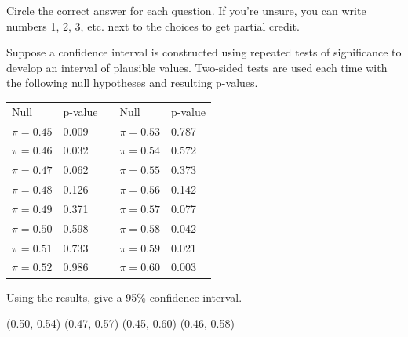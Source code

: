\documentclass{article}
\begin{document}
	Circle the correct answer for each question.  If you're unsure, you can write numbers 1, 2, 3, etc. next to the choices to get partial credit.\\[.5cm]
	\begin{mcquestions}
		\question Suppose a confidence interval is constructed using repeated tests of significance to develop an interval of plausible values.  Two-sided tests are used each time with the following null hypotheses and resulting p-values.
		\begin{center}
			\begin{tabular}{llp{.75in}ll}
				Null              & p-value & & Null              & p-value  \\
				$\pi = 0.45$ & 0.009   &                                 & $\pi = 0.53$ & 0.787    \\
				$\pi = 0.46$ & 0.032   &                                 & $\pi = 0.54$ & 0.572    \\
				$\pi = 0.47$ & 0.062   &                                 & $\pi = 0.55$ & 0.373    \\
				$\pi = 0.48$ & 0.126   &                                 & $\pi = 0.56$ & 0.142    \\
				$\pi = 0.49$ & 0.371   &                                 & $\pi = 0.57$ & 0.077    \\
				$\pi = 0.50$ & 0.598   &                                 & $\pi = 0.58$ & 0.042    \\
				$\pi = 0.51$ & 0.733   &                                 & $\pi = 0.59$ & 0.021    \\
				$\pi = 0.52$ & 0.986   &                                 & $\pi = 0.60$ & 0.003   
			\end{tabular}
		\end{center}
		Using the results, give a 95\% confidence interval.
		\begin{mcanswerslist}
			\answer (0.50, 0.54)
			\answer[correct] (0.47, 0.57)
			\answer (0.45, 0.60)
			\answer (0.46, 0.58)
		\end{mcanswerslist}
		

\end{mcquestions}
\end{document}

